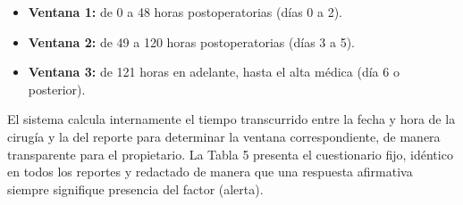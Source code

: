 \documentclass[stu, spanish]{apa7}
\begin{document}
\begin{itemize}
    \item \textbf{Ventana 1:} de 0 a 48 horas postoperatorias (d\'{i}as 0 a 2).
    \item \textbf{Ventana 2:} de 49 a 120 horas postoperatorias (d\'{i}as 3 a 5).
    \item \textbf{Ventana 3:} de 121 horas en adelante, hasta el alta m\'{e}dica (d\'{i}a 6 o posterior).
\end{itemize}

El sistema calcula internamente el tiempo transcurrido entre la fecha y hora de la cirug\'{i}a y la del reporte para determinar la ventana correspondiente, de manera transparente para el propietario. La Tabla 5 presenta el cuestionario fijo, id\'{e}ntico en todos los reportes y redactado de manera que una respuesta afirmativa siempre signifique presencia del factor (alerta).
\end{document}
